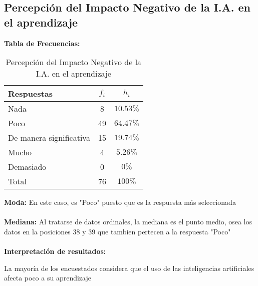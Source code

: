 \subsection{Percepción del Impacto Negativo de la I.A. en el aprendizaje}
\textbf{Tabla de Frecuencias:}

\begin{table}[h!]
	\centering
	\renewcommand{\arraystretch}{1.5}
	\begin{tabular}{l c c }
		\hline
		Respuestas & \(f_i\) & \(h_i\) \\
		\hline
		Nada & 8 & \(10.53\%\) \\
		Poco & 49 & \(64.47\%\) \\
		De manera significativa & 15 & \(19.74\%\) \\
		Mucho & 4 & \(5.26\%\) \\
		Demasiado & 0 & \(0\%\) \\
		\hline
		Total & 76 & \(100\%\) \\
		\hline
	\end{tabular}
	\caption{Percepción del Impacto Negativo de la I.A. en el aprendizaje}
	\label{tabla:percepciónNegativaEnElAprendizaje}
\end{table}

\textbf{Moda:} En este caso, es "Poco" puesto que es la respuesta más seleccionada \\ \\
\textbf{Mediana:} Al tratarse de datos ordinales, la mediana es el punto medio, osea los datos en la posiciones 38 y 39  que tambien pertecen a la respuesta "Poco" \\ \\
\textbf{Interpretación de resultados:}

La mayoría de los encuestados considera que el uso de las inteligencias artificiales afecta poco a su aprendizaje